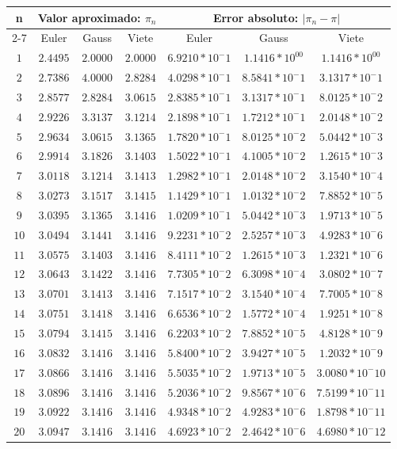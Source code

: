 \documentclass{article}
\providecommand{\abs}[1]{\lvert#1\rvert}
\begin{document}
\begin{tabular}{|c|c|c|c|c|c|c|}
\hline
\multirow{2}{*}{n} & \multicolumn{3}{|c|}{Valor aproximado: $\pi_n$} &\multicolumn{3}{|c|}{Error absoluto: $\abs{\pi_n - \pi}$} \\
\cline{2-7}
 & Euler & Gauss & Viete & Euler & Gauss & Viete \\
\hline
$ 1$ & $2.4495$ & $2.0000$ & $2.0000$ & $6.9210 *10^-1$ & $1.1416*10^00$ & $1.1416*10^00$ \\ 
$ 2$ & $2.7386$ & $4.0000$ & $2.8284$ & $4.0298 *10^-1$ & $8.5841*10^-1$ & $3.1317*10^-1$ \\ 
$ 3$ & $2.8577$ & $2.8284$ & $3.0615$ & $2.8385 *10^-1$ & $3.1317*10^-1$ & $8.0125*10^-2$ \\ 
$ 4$ & $2.9226$ & $3.3137$ & $3.1214$ & $2.1898 *10^-1$ & $1.7212*10^-1$ & $2.0148*10^-2$ \\ 
$ 5$ & $2.9634$ & $3.0615$ & $3.1365$ & $1.7820 *10^-1$ & $8.0125*10^-2$ & $5.0442*10^-3$ \\ 
$ 6$ & $2.9914$ & $3.1826$ & $3.1403$ & $1.5022 *10^-1$ & $4.1005*10^-2$ & $1.2615*10^-3$ \\ 
$ 7$ & $3.0118$ & $3.1214$ & $3.1413$ & $1.2982 *10^-1$ & $2.0148*10^-2$ & $3.1540*10^-4$ \\ 
$ 8$ & $3.0273$ & $3.1517$ & $3.1415$ & $1.1429 *10^-1$ & $1.0132*10^-2$ & $7.8852*10^-5$ \\ 
$ 9$ & $3.0395$ & $3.1365$ & $3.1416$ & $1.0209 *10^-1$ & $5.0442*10^-3$ & $1.9713*10^-5$ \\ 
$10$ & $3.0494$ & $3.1441$ & $3.1416$ & $9.2231 *10^-2$ & $2.5257*10^-3$ & $4.9283*10^-6$ \\ 
$11$ & $3.0575$ & $3.1403$ & $3.1416$ & $8.4111 *10^-2$ & $1.2615*10^-3$ & $1.2321*10^-6$ \\ 
$12$ & $3.0643$ & $3.1422$ & $3.1416$ & $7.7305 *10^-2$ & $6.3098*10^-4$ & $3.0802*10^-7$ \\ 
$13$ & $3.0701$ & $3.1413$ & $3.1416$ & $7.1517 *10^-2$ & $3.1540*10^-4$ & $7.7005*10^-8$ \\ 
$14$ & $3.0751$ & $3.1418$ & $3.1416$ & $6.6536 *10^-2$ & $1.5772*10^-4$ & $1.9251*10^-8$ \\ 
$15$ & $3.0794$ & $3.1415$ & $3.1416$ & $6.2203 *10^-2$ & $7.8852*10^-5$ & $4.8128*10^-9$ \\ 
$16$ & $3.0832$ & $3.1416$ & $3.1416$ & $5.8400 *10^-2$ & $3.9427*10^-5$ & $1.2032*10^-9$ \\ 
$17$ & $3.0866$ & $3.1416$ & $3.1416$ & $5.5035 *10^-2$ & $1.9713*10^-5$ & $3.0080*10^-10$ \\ 
$18$ & $3.0896$ & $3.1416$ & $3.1416$ & $5.2036 *10^-2$ & $9.8567*10^-6$ & $7.5199*10^-11$ \\ 
$19$ & $3.0922$ & $3.1416$ & $3.1416$ & $4.9348 *10^-2$ & $4.9283*10^-6$ & $1.8798*10^-11$ \\ 
$20$ & $3.0947$ & $3.1416$ & $3.1416$ & $4.6923 *10^-2$ & $2.4642*10^-6$ & $4.6980*10^-12$ \\ 
\hline 
\end{tabular}
\end{document}
